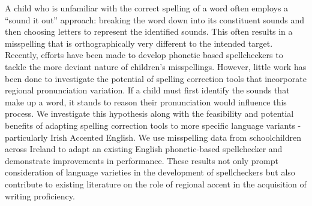 A child who is unfamiliar with the correct spelling of a word often employs a ``sound it out'' approach: breaking the word down into its constituent sounds and then choosing letters to represent the identified sounds. This often results in a misspelling that is orthographically very different to the intended target. Recently, efforts have been made to develop phonetic based spellcheckers to tackle the more deviant nature of children's misspellings. However, little work has been done to investigate the potential of spelling correction tools that incorporate regional pronunciation variation. If a child must first identify the sounds that make up a word, it stands to reason their pronunciation would influence this process. We investigate this hypothesis along with the feasibility and potential benefits of adapting spelling correction tools to more specific language variants - particularly Irish Accented English. We use misspelling data from schoolchildren across Ireland to adapt an existing English phonetic-based spellchecker and demonstrate improvements in performance. These results not only prompt consideration of language varieties in the development of spellcheckers but also contribute to existing literature on the role of regional accent in the acquisition of writing proficiency.
